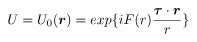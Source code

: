 \begin{equation}
U=U_0(\mbox{\boldmath$r$})= exp\{ {i F(r) \frac{\mbox{\boldmath$\tau$}\cdot \mbox{\boldmath$r$}}{r}}\}  \label{eq:ansatz}
\end{equation}

